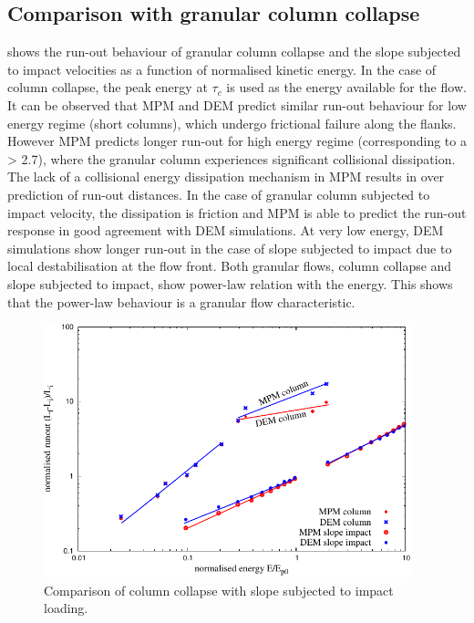 \subsection{Comparison with granular column collapse}

 shows the run-out behaviour of granular column 
collapse and the slope subjected to impact velocities as a function of 
normalised kinetic energy. In the case of column collapse, the peak energy at 
$\tau_c$ is used as the energy available for the flow. It can be observed that 
MPM and DEM predict similar run-out behaviour for low energy regime (short 
columns), which undergo frictional failure along the flanks. However MPM 
predicts longer run-out for high energy regime (corresponding to a > 2.7), 
where the granular column experiences significant collisional dissipation. The 
lack of a collisional energy dissipation mechanism in MPM results in over 
prediction of run-out distances. In the case of granular column subjected to 
impact velocity, the dissipation is friction and MPM is able to predict the 
run-out response in good agreement with DEM simulations. At very low energy, 
DEM simulations show longer run-out in the case of slope subjected to impact 
due to local destabilisation at the flow front. Both granular flows, column 
collapse and slope subjected to impact, show power-law relation with the 
energy. This shows that the power-law behaviour is a granular flow 
characteristic.

\begin{figure}[tbhp]
\centering
\includegraphics[width=0.95\textwidth]{Runout_Slope_Column}
\caption{Comparison of column collapse with slope subjected to impact loading.}
\label{fig:Runout_Slope_Column}
\end{figure}


